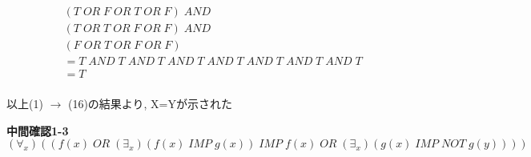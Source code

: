 \documentclass[dvipdfmx,10pt, a4j]{jarticle}
\theoremstyle{definition}
\begin{document}
\begin{enumerate}[i)]
\begin{enumerate}[1)]
\begin{align*}
                & (T\; OR\; F\; OR\; T\; OR\; F)\; AND\\
                & (T\; OR\; T\; OR\; F\; OR\; F)\; AND\\
                & (F\; OR\; T\; OR\; F\; OR\; F)\\
                &= T\; AND\; T\; AND\; T\; AND\; T\; AND\; T\; AND\; T\; AND\; T\; AND\; T\\
                &= T\\
            \end{align*}
        \end{enumerate}
        以上(1) $\to$ (16)の結果より, X=Yが示された\\
    \end{enumerate}
    
    \newpage
    \noindent
    \textbf{中間確認1-3} $(\forall_x)((f(x)\; OR\; (\exists_x)(f(x)\; IMP\; g(x))\; IMP\; f(x)\; OR\; (\exists_x)(g(x)\; IMP\; NOT\; g(y))))$\\
\end{document}
